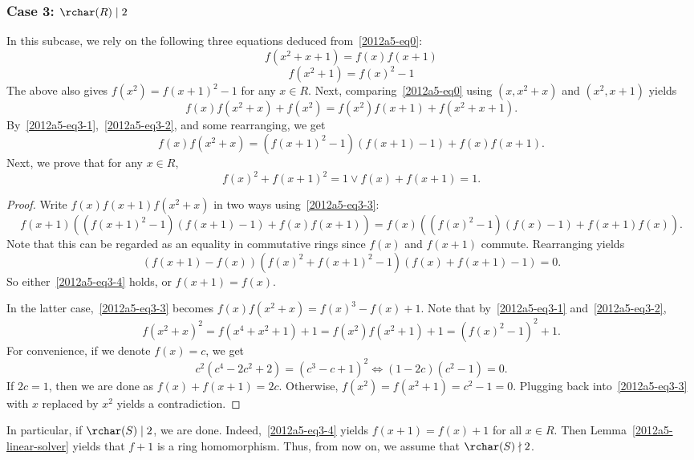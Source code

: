 



\newpage
\subsubsection*{Case 3: $\rchar(R) \mid 2$}

In this subcase, we rely on the following three equations deduced from~\eqref{2012a5-eq0}:
\[ f(x^2 + x + 1) = f(x) f(x + 1) \tag{3.1}\label{2012a5-eq3-1} \]
\[ f(x^2 + 1) = f(x)^2 - 1 \tag{3.2}\label{2012a5-eq3-2} \]
The above also gives $f(x^2) = f(x + 1)^2 - 1$ for any $x \in R$.
Next, comparing~\eqref{2012a5-eq0} using $(x, x^2 + x)$ and $(x^2, x + 1)$ yields
\[ f(x) f(x^2 + x) + f(x^2) = f(x^2) f(x + 1) + f(x^2 + x + 1). \]
By~\eqref{2012a5-eq3-1},~\eqref{2012a5-eq3-2}, and some rearranging, we get
\[ f(x) f(x^2 + x) = (f(x + 1)^2 - 1)(f(x + 1) - 1) + f(x) f(x + 1). \tag{3.3}\label{2012a5-eq3-3} \]
Next, we prove that for any $x \in R$,
\[ f(x)^2 + f(x + 1)^2 = 1 \vee f(x) + f(x + 1) = 1. \tag{3.4}\label{2012a5-eq3-4} \]

\begin{proof}
Write $f(x) f(x + 1) f(x^2 + x)$ in two ways using~\eqref{2012a5-eq3-3}:
\[ f(x + 1) ((f(x + 1)^2 - 1)(f(x + 1) - 1) + f(x) f(x + 1)) = f(x) ((f(x)^2 - 1)(f(x) - 1) + f(x + 1) f(x)). \]
Note that this can be regarded as an equality in commutative rings since $f(x)$ and $f(x + 1)$ commute.
Rearranging yields
\[ (f(x + 1) - f(x))(f(x)^2 + f(x + 1)^2 - 1)(f(x) + f(x + 1) - 1) = 0. \]
So either~\eqref{2012a5-eq3-4} holds, or $f(x + 1) = f(x)$.

In the latter case,~\eqref{2012a5-eq3-3} becomes $f(x) f(x^2 + x) = f(x)^3 - f(x) + 1$.
Note that by~\eqref{2012a5-eq3-1} and~\eqref{2012a5-eq3-2},
\[ f(x^2 + x)^2 = f(x^4 + x^2 + 1) + 1 = f(x^2) f(x^2 + 1) + 1 = (f(x)^2 - 1)^2 + 1. \]
For convenience, if we denote $f(x) = c$, we get
\[ c^2 (c^4 - 2c^2 + 2) = (c^3 - c + 1)^2 \iff (1 - 2c)(c^2 - 1) = 0. \]
If $2c = 1$, then we are done as $f(x) + f(x + 1) = 2c$.
Otherwise, $f(x^2) = f(x^2 + 1) = c^2 - 1 = 0$.
Plugging back into~\eqref{2012a5-eq3-3} with $x$ replaced by $x^2$ yields a contradiction.
\end{proof}

In particular, if $\rchar(S) \mid 2$, we are done.
Indeed,~\eqref{2012a5-eq3-4} yields $f(x + 1) = f(x) + 1$ for all $x \in R$.
Then Lemma~\ref{2012a5-linear-solver} yields that $f + 1$ is a ring homomorphism.
Thus, from now on, we assume that $\rchar(S) \nmid 2$.

